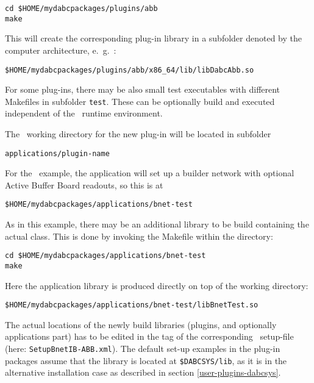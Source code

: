 \begin{verbatim}
cd $HOME/mydabcpackages/plugins/abb
make
\end{verbatim} 
This will create the corresponding plug-in library in a subfolder denoted by the
computer architecture, e.~g.~:
\begin{verbatim}
$HOME/mydabcpackages/plugins/abb/x86_64/lib/libDabcAbb.so
\end{verbatim} 


\item For some plug-ins, there may be also small test executables with different Makefiles in subfolder {\tt test}. These can be optionally build and executed independent of the
\dabc\ runtime environment.

\item The \dabc\ working directory for the new plug-in will be located in
subfolder 
\begin{verbatim}
applications/plugin-name 
\end{verbatim}
For the \ABB\ example, the application
will set up a builder network with optional Active Buffer Board readouts, so this
is at
\begin{verbatim}
$HOME/mydabcpackages/applications/bnet-test
\end{verbatim}
As in this example, there may be an additional library to be build containing the actual
 class. This is done by invoking the Makefile within the directory:
\begin{verbatim}
cd $HOME/mydabcpackages/applications/bnet-test
make
\end{verbatim}
Here the application library is produced directly on top of the working directory: 
\begin{verbatim}
$HOME/mydabcpackages/applications/bnet-test/libBnetTest.so
\end{verbatim}

\item The actual locations of the newly build libraries (plugins, and optionally applications part) has to be edited in the 
 tag of the corresponding \dabc\ setup-file (here: {\tt SetupBnetIB-ABB.xml}).
The default set-up examples in the plug-in packages assume that the library is located
at {\tt \$DABCSYS/lib}, as it is in the alternative installation case as described in
section \ref{user-plugins-dabcsys}.

\enum



